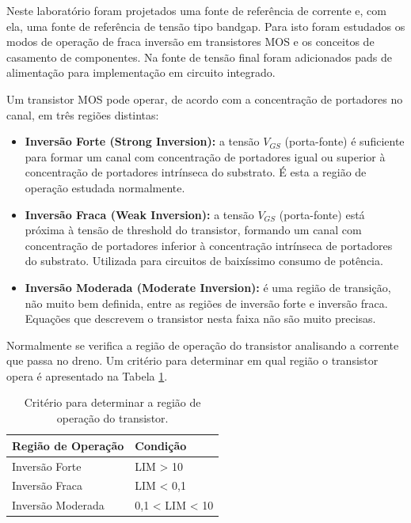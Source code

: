 \documentclass[12pt,a4paper]{article}
\begin{document}
Neste laboratório foram projetados uma fonte de referência de corrente e, com ela, uma fonte de referência de tensão tipo bandgap. Para isto foram estudados os modos de operação de fraca inversão em transistores MOS e os conceitos de casamento de componentes. Na fonte de tensão final foram adicionados pads de alimentação para implementação em circuito integrado.

Um transistor MOS pode operar, de acordo com a concentração de portadores no canal, em três regiões distintas:

\begin{itemize}
    \item \textbf{Inversão Forte (Strong Inversion):} a tensão $V_{GS}$ (porta-fonte) é suficiente para formar um canal com concentração de portadores igual ou superior à concentração de portadores intrínseca do substrato. É esta a região de operação estudada normalmente.
    
    \item \textbf{Inversão Fraca (Weak Inversion):} a tensão $V_{GS}$ (porta-fonte) está próxima à tensão de threshold do transistor, formando um canal com concentração de portadores inferior à concentração intrínseca de portadores do substrato. Utilizada para circuitos de baixíssimo consumo de potência.
    
    \item \textbf{Inversão Moderada (Moderate Inversion):} é uma região de transição, não muito bem definida, entre as regiões de inversão forte e inversão fraca. Equações que descrevem o transistor nesta faixa não são muito precisas.
\end{itemize}

Normalmente se verifica a região de operação do transistor analisando a corrente que passa no dreno. Um critério para determinar em qual região o transistor opera é apresentado na Tabela \ref{tab:operacao}.

\begin{table}[H]
\centering
\caption{Critério para determinar a região de operação do transistor.}
\label{tab:operacao}
\begin{tabular}{@{}ll@{}}
\toprule
\textbf{Região de Operação} & \textbf{Condição} \\ \midrule
Inversão Forte & LIM > 10 \\
Inversão Fraca & LIM < 0,1 \\
Inversão Moderada & 0,1 < LIM < 10 \\ \bottomrule
\end{tabular}
\end{table}
\end{document}
